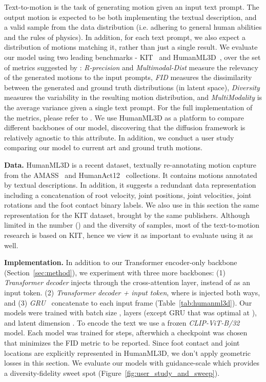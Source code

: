 Text-to-motion is the task of generating motion given an input text prompt. The output motion is expected to be both implementing the textual description, and a valid sample from the data distribution (i.e. adhering to general human abilities and the rules of physics). In addition, for each text prompt, we also expect a distribution of motions matching it, rather than just a single result. We evaluate our model using two leading benchmarks - KIT~\citep{plappert2016kit} and HumanML3D~\citep{guo2022generating}, over the set of metrics suggested by \citet{guo2022generating}: 
 \textit{R-precision} and \textit{Multimodal-Dist} measure the relevancy of the generated motions to the input prompts, \textit{FID} measures the dissimilarity between the generated and ground truth distributions (in latent space), \textit{Diversity} measures the variability in the resulting motion distribution, and \textit{MultiModality} is the average variance given a single text prompt. For the full implementation of the metrics, please refer to \citet{guo2022generating}.
We use HumanML3D as a platform to compare different backbones of our model, discovering that the diffusion framework is relatively agnostic to this attribute.
In addition, we conduct a user study comparing our model to current art and ground truth motions. 

\textbf{Data.}
HumanML3D is a recent dataset, textually re-annotating motion capture from the AMASS~\citep{AMASS:ICCV:2019} and HumanAct12~\citep{guo2020action2motion} collections. 
It contains  motions annotated by  textual descriptions.
In addition, it suggests a redundant data representation including a concatenation of root velocity, joint positions, joint velocities, joint rotations and the foot contact binary labels. We also use in this section the same representation for the KIT dataset, brought by the same publishers. 
Although limited in the number () and the diversity of samples, most of the text-to-motion research is based on KIT, hence we view it as important to evaluate using it as well. 

\textbf{Implementation.}
In addition to our Transformer encoder-only backbone (Section~\ref{sec:method}), we experiment \ourmethod{} with three more backbones: (1) \textit{Transformer decoder} injects  through the cross-attention layer, instead of as an input token. (2) \textit{Transformer decoder + input token}, where  is injected both ways, and (3) \textit{GRU}~\citep{cho2014learning} concatenate  to each input frame (Table~\ref{tab:humanml3d}). 
Our models were trained with batch size ,  layers (except GRU that was optimal at ), and latent dimension . To encode the text we use a frozen \textit{CLIP-ViT-B/32} model.
Each model was trained for  steps, afterwhich a checkpoint was chosen that minimizes the FID metric to be reported. Since foot contact and joint locations are explicitly represented in HumanML3D, we don't apply geometric losses in this section. We evaluate our models with guidance-scale  which provides a diversity-fidelity sweet spot (Figure~\ref{fig:user_study_and_sweep}).


